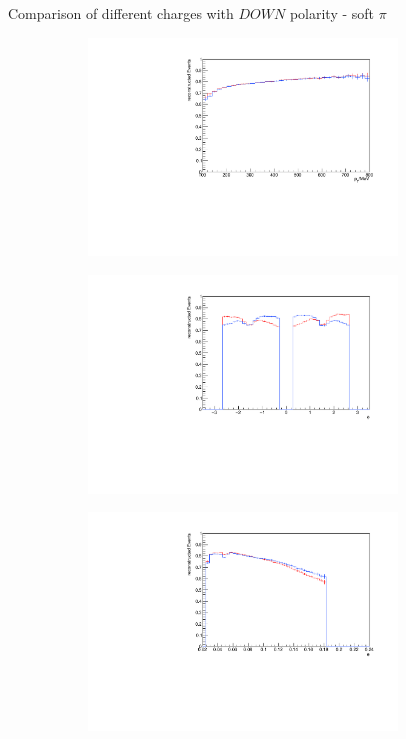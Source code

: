 \documentclass[11pt]{beamer}
\begin{document}
\begin{frame}{Comparison of different charges with $DOWN$ polarity - soft $\pi$}
\begin{figure}
\begin{subfigure}{0.45\textwidth}
\includegraphics[width=0.9\textwidth]{fourth/down_pdf/combined/h_pt_reco_SPi.pdf}
\end{subfigure}
\begin{subfigure}{0.45\textwidth}
\includegraphics[width=0.9\textwidth]{fourth/down_pdf/combined/h_phi_reco_SPi.pdf}
\end{subfigure}
\begin{subfigure}{0.45\textwidth}
\includegraphics[width=0.9\textwidth]{fourth/down_pdf/combined/h_theta_reco_SPi.pdf}

\end{subfigure}
\end{figure}
\end{frame}
\end{document}
